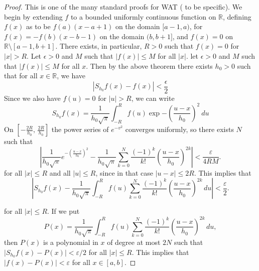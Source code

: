 \documentclass[
  journal=largetwo,
  year=2025,
  volume=37,
]{cup-journal}
\begin{document}
\begin{proof}
    This is one of the many standard proofs for WAT (\cite{Schep2007} to be specific). We begin by extending $f$ to a bounded uniformly continuous function on $\mathbb{R}$, defining $f(x)$ as to be $f(a)(x-a+1)$ on the domain $[a-1,a)$, for $f(x)=-f(b)(x-b-1)$ on the domain $(b,b+1]$, and $f(x)=0$ on $\mathbb{R}\setminus [a-1,b+1]$. There exists, in particular, $R>0$ such that $f(x)=0$ for $|x|>R$. Let $\epsilon>0$ and $M$ such that $|f(x)|\leq M$ for all $|x|$. let $\epsilon > 0$ and $M$ such that $|f(x)|\leq M$ for all $x$. Then by the above theorem there exists $h_{0}>0$ such that for all $x\in\mathbb{R}$, we have 
    \begin{equation}
        |S_{h_{0}}f(x)-f(x)| < \frac{\epsilon}{2}
    \end{equation}
    Since we also have $f(u)=0$ for $|u|>R$, we can write 
    \begin{equation}
        S_{h_{0}}f(x) = \frac{1}{h_{0}\sqrt{\pi}} \int^{R}_{-R} f(u)\exp{-\left(\frac{u-x}{h_{0}}\right)^{2}} \: du
    \end{equation}
    On $\left[-\frac{2R}{h_0},\, \frac{2R}{h_0}\right]$ the power series of $e^{-v^2}$ 
converges uniformly, so there exists $N$ such that
\begin{equation}
\left|
\frac{1}{h_0\sqrt{\pi}} e^{-\left(\frac{u-x}{h_0}\right)^2}
-
\frac{1}{h_0\sqrt{\pi}}
\sum_{k=0}^{N} \frac{(-1)^k}{k!}
\left( \frac{u-x}{h_0} \right)^{2k}
\right|
< \frac{\varepsilon}{4RM}.
\end{equation}
for all $\lvert x\rvert \le R$ and all $\lvert u\rvert \le R$, since in that case 
$\lvert u-x\rvert \le 2R$.  
This implies that
\begin{equation}
    \left|
    S_{h_0} f(x)
    -
    \frac{1}{h_0\sqrt{\pi}}
    \int_{-R}^{R}
    f(u)
    \sum_{k=0}^{N} \frac{(-1)^k}{k!}
    \left( \frac{u-x}{h_0} \right)^{2k}
    \, du
    \right|
    < \frac{\varepsilon}{2}.
    \end{equation}

    for all $\lvert x\rvert \le R$.  
    If we put
    \begin{equation}
    P(x)
    =
    \frac{1}{h_0\sqrt{\pi}}
    \int_{-R}^{R}
    f(u)
    \sum_{k=0}^{N} \frac{(-1)^k}{k!}
    \left( \frac{u-x}{h_0} \right)^{2k}
    \, du,
\end{equation}
    then $P(x)$ is a polynomial in $x$ of degree at most $2N$ such that $\lvert S_{h_0} f(x) - P(x) \rvert < \varepsilon/2$ for all $\lvert x\rvert \le R$. This implies that $\lvert f(x) - P(x) \rvert < \varepsilon$ for all $x \in [a,b]$.
\end{proof}
\end{document}
